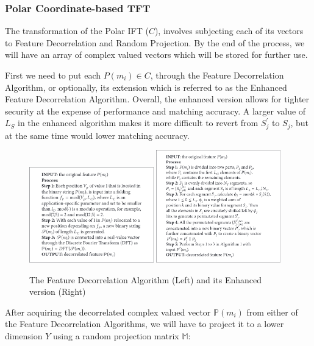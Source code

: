 \documentclass[fyp]{socreport}
\begin{document}
\subsubsection{Polar Coordinate-based TFT}
The transformation of the Polar IFT ($C$), involves subjecting each of its vectors to Feature Decorrelation and Random Projection. By the end of the process, we will have an array of complex valued vectors which will be stored for further use.

First we need to put each $P(m_i) \in C$, through the Feature Decorrelation Algorithm, or optionally, its extension which is referred to as the Enhanced Feature Decorrelation Algorithm. Overall, the enhanced version allows for tighter security at the expense of performance and matching accuracy. A larger value of $L_S$ in the enhanced algorithm makes it more difficult to revert from $S_j^\prime$ to $S_j$, but at the same time would lower matching accuracy.

\begin{figure}[H]
	\centering
	\includegraphics[width=0.48\textwidth]
	{FDA}
	\includegraphics[width=0.48\textwidth]
	{EFDA}
	\caption{The Feature Decorrelation Algorithm (Left) and its Enhanced version (Right)}
\end{figure}

After acquiring the decorrelated complex valued vector $\mathbb{P}(m_i)$ from either of the Feature Decorrelation Algorithms, we will have to project it to a lower dimension $Y$ using a random projection matrix $\mathbb{M}$:
\end{document}
